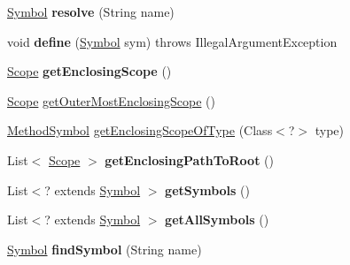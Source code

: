 \begin{DoxyCompactItemize}
\item 
\mbox{\label{classlime_1_1antlr4_1_1BaseScope_a02c825647d68c572b33fd3eae4f5aba4}} 
\hyperlink{interfacelime_1_1antlr4_1_1Symbol}{Symbol} {\bfseries resolve} (String name)
\item 
\mbox{\label{classlime_1_1antlr4_1_1BaseScope_a8c1c91f0ecf891905b1578ac026e453f}} 
void {\bfseries define} (\hyperlink{interfacelime_1_1antlr4_1_1Symbol}{Symbol} sym)  throws Illegal\+Argument\+Exception 
\item 
\mbox{\label{classlime_1_1antlr4_1_1BaseScope_a0ae6247a1ace7ef18fb30bd3cb10b2f1}} 
\hyperlink{interfacelime_1_1antlr4_1_1Scope}{Scope} {\bfseries get\+Enclosing\+Scope} ()
\item 
\hyperlink{interfacelime_1_1antlr4_1_1Scope}{Scope} \hyperlink{classlime_1_1antlr4_1_1BaseScope_affbef0d910750e3da48f581d10f68b68}{get\+Outer\+Most\+Enclosing\+Scope} ()
\item 
\hyperlink{classlime_1_1antlr4_1_1MethodSymbol}{Method\+Symbol} \hyperlink{classlime_1_1antlr4_1_1BaseScope_a3ec1571964f0556d2137fcaeacfe6ef2}{get\+Enclosing\+Scope\+Of\+Type} (Class$<$?$>$ type)
\item 
\mbox{\label{classlime_1_1antlr4_1_1BaseScope_ad949a2376b037a965a06c5f12f3a0a8f}} 
List$<$ \hyperlink{interfacelime_1_1antlr4_1_1Scope}{Scope} $>$ {\bfseries get\+Enclosing\+Path\+To\+Root} ()
\item 
\mbox{\label{classlime_1_1antlr4_1_1BaseScope_ad2e894a88f4b93ee6ea599953ee95954}} 
List$<$? extends \hyperlink{interfacelime_1_1antlr4_1_1Symbol}{Symbol} $>$ {\bfseries get\+Symbols} ()
\item 
\mbox{\label{classlime_1_1antlr4_1_1BaseScope_aef2ab699bb0b24e97d94435ee0b20de5}} 
List$<$? extends \hyperlink{interfacelime_1_1antlr4_1_1Symbol}{Symbol} $>$ {\bfseries get\+All\+Symbols} ()
\item 
\mbox{\label{classlime_1_1antlr4_1_1BaseScope_a9c2788f3e688f3c3c33eb5044919c4a5}} 
\hyperlink{interfacelime_1_1antlr4_1_1Symbol}{Symbol} {\bfseries find\+Symbol} (String name)

\end{DoxyCompactItemize}
